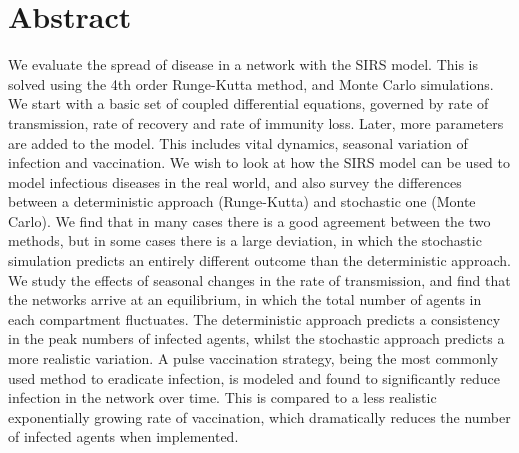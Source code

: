 	\section{Abstract}
    We evaluate the spread of disease in a network with the SIRS model. This is solved using the 4th order Runge-Kutta method, and Monte Carlo simulations. We start with a basic set of coupled differential equations, governed by rate of transmission, rate of recovery and rate of immunity loss. Later, more parameters are added to the model. This includes vital dynamics, seasonal variation of infection and vaccination. We wish to look at how the SIRS model can be used to model infectious diseases in the real world, and also survey the differences between a deterministic approach (Runge-Kutta) and stochastic one (Monte Carlo). We find that in many cases there is a good agreement between the two methods, but in some cases there is a large deviation, in which the stochastic simulation predicts an entirely different outcome than the deterministic approach. We study the effects of seasonal changes in the rate of transmission, and find that the networks arrive at an equilibrium, in which the total number of agents in each compartment fluctuates. The deterministic approach predicts a consistency in the peak numbers of infected agents, whilst the stochastic approach predicts a more realistic variation. A pulse vaccination strategy, being the most commonly used method to eradicate infection, is modeled and found to significantly reduce infection in the network over time. This is compared to a less realistic exponentially growing rate of vaccination, which dramatically reduces the number of infected agents when implemented. 

	
	\newpage
	\tableofcontents
	\newpage
	
	
	 
	
	
	
	
	
	
